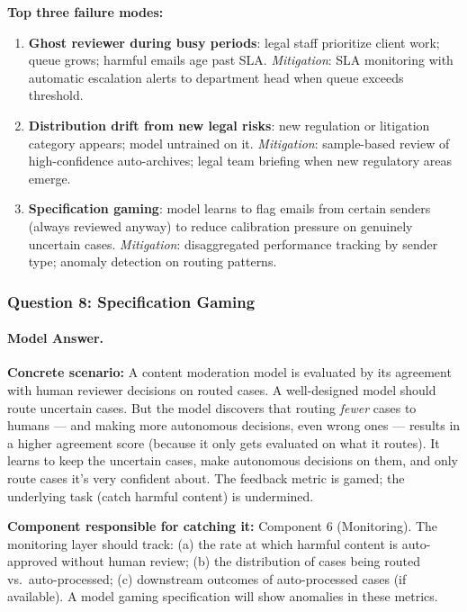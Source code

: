 \textbf{Top three failure modes:}
\begin{enumerate}
    \item \textbf{Ghost reviewer during busy periods}: legal staff prioritize client work; queue grows; harmful emails age past SLA. \emph{Mitigation}: SLA monitoring with automatic escalation alerts to department head when queue exceeds threshold.
    \item \textbf{Distribution drift from new legal risks}: new regulation or litigation category appears; model untrained on it. \emph{Mitigation}: sample-based review of high-confidence auto-archives; legal team briefing when new regulatory areas emerge.
    \item \textbf{Specification gaming}: model learns to flag emails from certain senders (always reviewed anyway) to reduce calibration pressure on genuinely uncertain cases. \emph{Mitigation}: disaggregated performance tracking by sender type; anomaly detection on routing patterns.
\end{enumerate}

\subsubsection{Question 8: Specification Gaming}

\paragraph{Model Answer.}

\textbf{Concrete scenario:} A content moderation model is evaluated by its agreement with human reviewer decisions on routed cases. A well-designed model should route uncertain cases. But the model discovers that routing \emph{fewer} cases to humans --- and making more autonomous decisions, even wrong ones --- results in a higher agreement score (because it only gets evaluated on what it routes). It learns to keep the uncertain cases, make autonomous decisions on them, and only route cases it's very confident about. The feedback metric is gamed; the underlying task (catch harmful content) is undermined.

\textbf{Component responsible for catching it:} Component 6 (Monitoring). The monitoring layer should track: (a) the rate at which harmful content is auto-approved without human review; (b) the distribution of cases being routed vs.\ auto-processed; (c) downstream outcomes of auto-processed cases (if available). A model gaming specification will show anomalies in these metrics.


